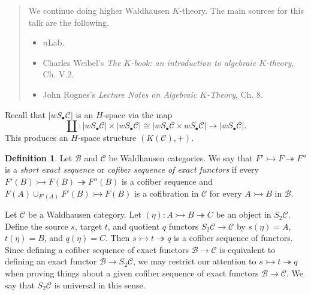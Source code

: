 \documentclass[10pt,letterpaper,cm]{nupset}
\theoremstyle{definition}
\newtheorem{definition}{Definition}
\theoremstyle{theorem}
\theoremstyle{remark}
\newcommand{\1}{\mathbf{1}}
\renewcommand{\b}{\mathscr{B}}
\renewcommand{\c}{\mathscr{C}}
\newcommand{\0}{\vec 0}
\begin{document}
\begin{abstract}
We continue doing higher Waldhausen $K$-theory. The main sources for this talk are the following.
\begin{itemize}
\item $n$Lab.
\item Charles Weibel's \textit{The $K$-book: an introduction to algebraic $K$-theory},  Ch. V.2.
\item John Rognes's \textit{Lecture Notes on Algebraic $K$-Theory}, Ch. 8.
\end{itemize}
\end{abstract}

\smallskip

Recall that $\lvert{wS_{\bullet} \c}\rvert$ is an $H$-space via the map $$\coprod: \lvert{wS_{\bullet} \c}\rvert \times \lvert{wS_{\bullet} \c}\rvert \cong \lvert{wS_{\bullet} \c \times  wS_{\bullet} \c}\rvert\to \lvert{wS_{\bullet} \c}\rvert.$$ This produces an $H$-space structure $\left(K(\c), +\right)$.


\begin{definition}
Let $\b$ and $\c$ be Waldhausen categories. We say that $F' \rightarrowtail F \twoheadrightarrow F''$ is a \textit{short exact sequence} or \textit{cofiber sequence of exact functors} if every $F'(B) \rightarrowtail F(B) \twoheadrightarrow F''(B)$ is a cofiber sequence and $F(A) \cup_{F'(A)} F'(B) \rightarrowtail F(B)$ is a cofibration in $\c$ for every $A \rightarrowtail B$ in $\b$.
\end{definition}

Let $\c$ be a Waldhausen category. Let $(\eta): A \rightarrowtail B \twoheadrightarrow C$ be an object in $S_2\c$. Define the source $s$, target $t$, and quotient $q$ functors $S_2\c \to \c$ by $s(\eta) = A$, $t(\eta) = B$, and $q(\eta) = C$. Then $s \rightarrowtail t \twoheadrightarrow q$ is a cofiber sequence of functors. Since defining a cofiber sequence of exact functors $\b \to \c$ is equivalent to defining an exact functor $\b \to S_2 \c$, we may restrict our attention to $s \rightarrowtail t \twoheadrightarrow q$ when proving things about a given cofiber sequence of exact functors $\b \to \c$. We say that $S_2\c$ is universal in this sense.
\end{document}
